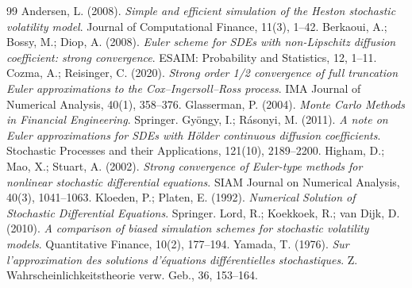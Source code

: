 \documentclass[11pt]{article}
\theoremstyle{plain}
\theoremstyle{definition}
\theoremstyle{remark}
\begin{document}
\begin{thebibliography}{99}
                Andersen, L. (2008). \emph{Simple and efficient simulation of the Heston stochastic volatility model}. Journal of Computational Finance, 11(3), 1--42.
       Berkaoui, A.; Bossy, M.; Diop, A. (2008). \emph{Euler scheme for SDEs with non-Lipschitz diffusion coefficient: strong convergence}. ESAIM: Probability and Statistics, 12, 1--11.
          Cozma, A.; Reisinger, C. (2020). \emph{Strong order 1/2 convergence of full truncation Euler approximations to the Cox--Ingersoll--Ross process}. IMA Journal of Numerical Analysis, 40(1), 358--376.
              Glasserman, P. (2004). \emph{Monte Carlo Methods in Financial Engineering}. Springer.
           Gy\"ongy, I.; R\'asonyi, M. (2011). \emph{A note on Euler approximations for SDEs with H\"older continuous diffusion coefficients}. Stochastic Processes and their Applications, 121(10), 2189--2200.
         Higham, D.; Mao, X.; Stuart, A. (2002). \emph{Strong convergence of Euler-type methods for nonlinear stochastic differential equations}. SIAM Journal on Numerical Analysis, 40(3), 1041--1063.
           Kloeden, P.; Platen, E. (1992). \emph{Numerical Solution of Stochastic Differential Equations}. Springer.
                    Lord, R.; Koekkoek, R.; van Dijk, D. (2010). \emph{A comparison of biased simulation schemes for stochastic volatility models}. Quantitative Finance, 10(2), 177--194.
                  Yamada, T. (1976). \emph{Sur l'approximation des solutions d'\'equations diff\'erentielles stochastiques}. Z. Wahrscheinlichkeitstheorie verw. Geb., 36, 153--164.
\end{thebibliography}
\end{document}
